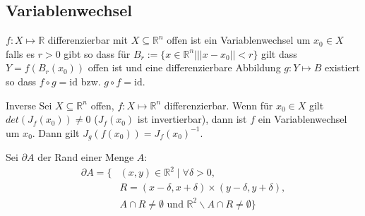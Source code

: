 \documentclass[a4paper,10pt]{article}
\def\R{\mathbb{R}}
\begin{document}
\subsection{Variablenwechsel}

$f: X \mapsto \R$ differenzierbar mit $X \subseteq \R^n$ offen ist ein Variablenwechsel um $x_0 \in X$ falls es $r > 0$ gibt so dass für $B_r := \{x \in \R^n | ||x-x_0|| < r \}$ gilt dass $Y = f(B_r(x_0))$ offen ist und eine differenzierbare Abbildung $g: Y \mapsto B$ existiert so dass $f \circ g = \mathrm{id}$ bzw. $g \circ f = \mathrm{id}$.

\begin{subbox}{Inverse}
  Sei $X \subseteq \R^n$ offen, $f: X \mapsto \R^n$ differenzierbar. Wenn für $x_0 \in X$ gilt $det(J_f(x_0)) \neq 0$ ($J_f(x_0)$ ist invertierbar), dann ist $f$ ein Variablenwechsel um $x_0$. Dann gilt $J_g(f(x_0)) = J_f(x_0)^{-1}$.
\end{subbox}

Sei \(\partial A\) der Rand einer Menge \(A\):
\begin{align*}
    \partial A = \Big\{ &(x,y) \in \R^2 \mid \forall \delta > 0, \\ &R = (x - \delta, x + \delta) \times (y - \delta, y + \delta), \\
    &A \cap R \neq \emptyset \text{ und } \R^2 \backslash A \cap R \neq \emptyset \Big\}
\end{align*}
\end{document}
